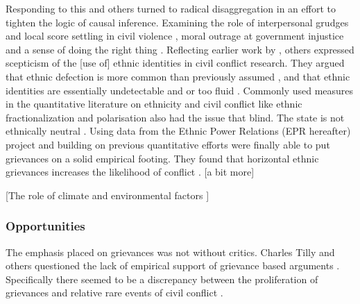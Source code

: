 \documentclass[12pt]{article}
\begin{document}
Responding to this \citet{Kalyvas2006} and others turned to radical
disaggregation in an effort to tighten the logic of causal inference. Examining
the role of interpersonal grudges and local score settling in civil violence
\citep{Kalyvas2006, Kalyvas_2008}, moral outrage at government injustice and a
sense of doing the right thing \citep{Wood2003}. Reflecting earlier work by
\citet{barth1969}, others expressed scepticism of the [use of] ethnic identities
in civil conflict research. They argued that ethnic defection is more common
than previously assumed \citep{Kalyvas_2008, Staniland_2012}, and that ethnic
identities are essentially undetectable and or too fluid \citep{Gilley_2004,
Chandra2006}. Commonly used measures in the quantitative literature on ethnicity
and civil conflict like ethnic fractionalization \citep{Alesina2003,
Posner2004} and polarisation \citep{Montalvo2005} also had the issue that 
blind. The state is not ethnically neutral \citep{CedermanLars-Erik2013Igac}.
Using data from the Ethnic Power Relations (EPR hereafter) project
\citet{CedermanLars-Erik2013Igac} and building on previous quantitative efforts
\citep{Gurr_1993, Goldstone_2010} were finally able to put grievances on a solid
empirical footing. They found that horizontal ethnic grievances
increases the likelihood of conflict \citep{CedermanLars-Erik2013Igac}. [a bit
more]

[The role of climate and environmental factors \citep{Detges_2017,
von_Uexkull_2021}] %

\subsubsection{Opportunities} \label{Opportunities}

The emphasis placed on grievances was not without critics. Charles Tilly and
others questioned the lack of empirical support of grievance based arguments
\citep{Oberschall_1978, Brush_1996}. Specifically there seemed to be a
discrepancy between the proliferation of grievances and relative rare events of
civil conflict \citep{Snyder_1972, TillyCharles1978Fmtr, Skocpol_1979}. 
\end{document}
